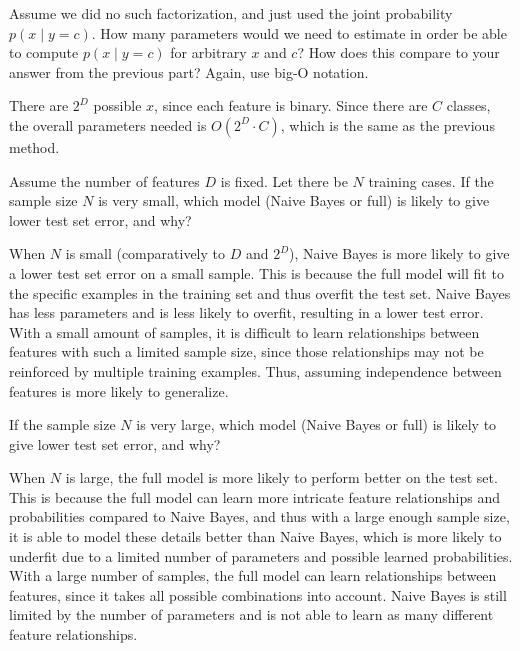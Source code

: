 \problem[8] Assume we did no such factorization, and just used the joint probability $p(x \mid y = c)$. How many parameters would we need to estimate in order be able to compute $p(x \mid y = c)$ for arbitrary $x$ and $c$? How does this compare to your answer from the previous part? Again, use big-O notation.

\begin{solution}
    There are $2^D$ possible $x$, since each feature is binary. Since there are $C$ classes, the overall parameters needed is $O(2^D \cdot C)$, which is the same as the previous method.
\end{solution}

\newpage

\problem[4] Assume the number of features $D$ is fixed. Let there be $N$ training cases. If the sample size $N$ is very small, which model (Naive Bayes or full) is likely to give lower test set error, and why?

\begin{solution}
    When $N$ is small (comparatively to $D$ and $2^D$), Naive Bayes is more likely to give a lower test set error on a small sample. This is because the full model will fit to the specific examples in the training set and thus overfit the test set. Naive Bayes has less parameters and is less likely to overfit, resulting in a lower test error. With a small amount of samples, it is difficult to learn relationships between features with such a limited sample size, since those relationships may not be reinforced by multiple training examples. Thus, assuming independence between features is more likely to generalize.
\end{solution}

\problem[4] If the sample size $N$ is very large, which model (Naive Bayes or full) is likely to give lower test set error, and why?
\begin{solution}
    When $N$ is large, the full model is more likely to perform better on the test set. This is because the full model can learn more intricate feature relationships and probabilities compared to Naive Bayes, and thus with a large enough sample size, it is able to model these details better than Naive Bayes, which is more likely to underfit due to a limited number of parameters and possible learned probabilities. With a large number of samples, the full model can learn relationships between features, since it takes all possible combinations into account. Naive Bayes is still limited by the number of parameters and is not able to learn as many different feature relationships.
\end{solution}

